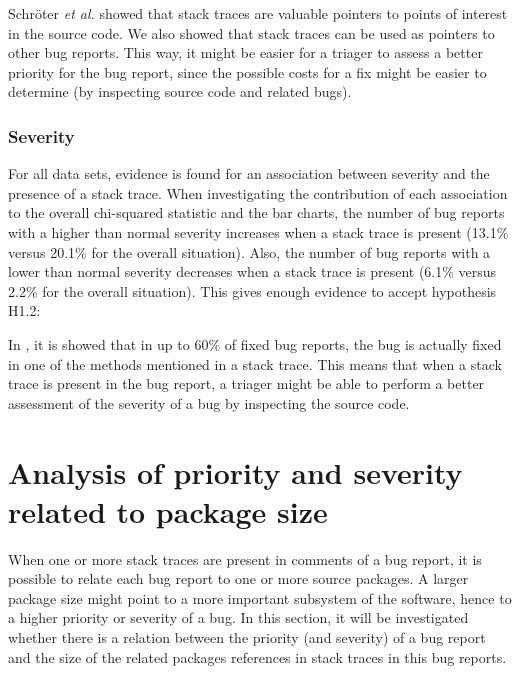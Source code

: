 \vspace{\baselineskip}
\hypaa{}
\vspace{\baselineskip}

\noindent
Schr\"{o}ter \emph{et al.} \cite{Schroter2010} showed that stack traces are valuable pointers to points of interest in the source code. We also showed that stack traces can be used as pointers to other bug reports. This way, it might be easier for a triager to assess a better priority for the bug report, since the possible costs for a fix might be easier to determine (by inspecting source code and related bugs).

\subsubsection{Severity}
For all data sets, evidence is found for an association between severity and the presence of a stack trace. When investigating the contribution of each association to the overall chi-squared statistic and the bar charts, the number of bug reports with a higher than normal severity increases when a stack trace is present (13.1\% versus 20.1\% for the overall situation). Also, the number of bug reports with a lower than normal severity decreases when a stack trace is present (6.1\% versus 2.2\% for the overall situation). This gives enough evidence to accept hypothesis H1.2:

\vspace{\baselineskip}
\hypab{}
\vspace{\baselineskip}

\noindent
In \cite{Schroter2010}, it is showed that in up to 60\% of fixed bug reports, the bug is actually fixed in one of the methods mentioned in a stack trace. This means that when a stack trace is present in the bug report, a triager might be able to perform a better assessment of the severity of a bug by inspecting the source code.


\section{Analysis of priority and severity related to package size} %
\label{sec:analysis_of_priority_and_severity_related_to_package_size}
When one or more stack traces are present in comments of a bug report, it is possible to relate each bug report to one or more source packages. A larger package size might point to a more important subsystem of the software, hence to a higher priority or severity of a bug. In this section, it will be investigated whether there is a relation between the priority (and severity) of a bug report and the size of the related packages references in stack traces in this bug reports.

